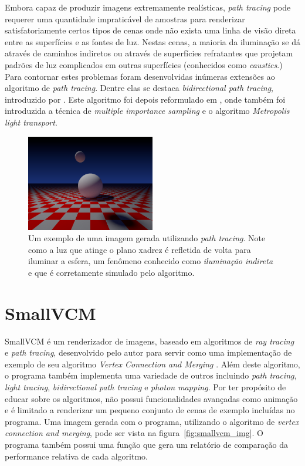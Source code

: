\documentclass[tg]{mdtufsm}
\begin{document}
Embora capaz de produzir imagens extremamente realísticas, \emph{path tracing} pode requerer uma
quantidade impraticável de amostras para renderizar satisfatoriamente certos tipos de cenas onde não
exista uma linha de visão direta entre as superfícies e as fontes de luz. Nestas cenas, a maioria da
iluminação se dá através de caminhos indiretos ou através de superfícies refratantes que projetam
padrões de luz complicados em outras superfícies (conhecidos como \emph{caustics}.) Para contornar
estes problemas foram desenvolvidas inúmeras extensões ao algoritmo de \emph{path tracing}. Dentre
elas se destaca \emph{bidirectional path tracing}, introduzido por \citet{lafortune1993}. Este
algoritmo foi depois reformulado em \citep{veach1997}, onde também foi introduzida a técnica de
\emph{multiple importance sampling} e o algoritmo \emph{Metropolis light transport}.

\begin{figure}
	\centering
	\includegraphics[width=0.5\textwidth]{exemplo_imagem}
	\caption[Um exemplo de uma imagem gerada utilizando \emph{path tracing}.]{
		Um exemplo de uma imagem gerada utilizando \emph{path tracing}. Note como a luz que atinge o
		plano xadrez é refletida de volta para iluminar a esfera, um fenômeno conhecido como
		\emph{iluminação indireta} e que é corretamente simulado pelo algoritmo.
	}
	\label{fig:path_tracing}
\end{figure}

\section{SmallVCM}

SmallVCM \citep{smallvcm} é um renderizador de imagens, baseado em algoritmos de \emph{ray tracing} e \emph{path tracing}, desenvolvido pelo autor para servir como uma implementação de exemplo de seu algoritmo \emph{Vertex Connection and Merging} \citep{georgiev2012}. Além deste algoritmo, o programa também implementa uma variedade de outros incluindo \emph{path tracing}, \emph{light tracing}, \emph{bidirectional path tracing} e \emph{photon mapping}. Por ter propósito de educar sobre os algoritmos, não possui funcionalidades avançadas como animação e é limitado a renderizar um pequeno conjunto de cenas de exemplo incluídas no programa. Uma imagem gerada com o programa, utilizando o algoritmo de \emph{vertex connection and merging}, pode ser vista na figura~\ref{fig:smallvcm_img}. O programa também possui uma função que gera um relatório de comparação da performance relativa de cada algoritmo.
\end{document}
